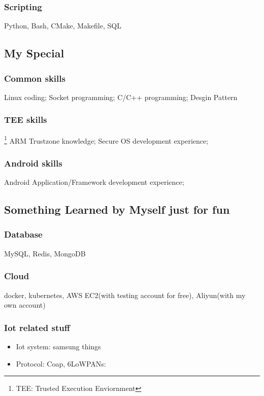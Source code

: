 \documentclass{article}
\begin{document}
\subsubsection{Scripting}
Python, Bash, CMake, Makefile, SQL

\subsection{My Special}

\subsubsection {Common skills}
Linux coding; Socket programming; C/C++ programming; Desgin Pattern

\subsubsection {TEE skills} \footnote{TEE: Trusted Execution Enviornment}
ARM Trustzone knowledge; Secure OS development experience;

\subsubsection {Android skills}
Android Application/Framework development experience;

\subsection {Something Learned by Myself just for fun}
\subsubsection {Database}
MySQL, Redis, MongoDB

\subsubsection {Cloud}
docker, kubernetes, AWS EC2(with testing account for free), Aliyun(with my own account)

\subsubsection{Iot related stuff}
\begin{itemize}
\item[1] Iot system: samsung things
\item[2] Protocol: Coap, 6LoWPANs:
\end{itemize}
\end{document}
